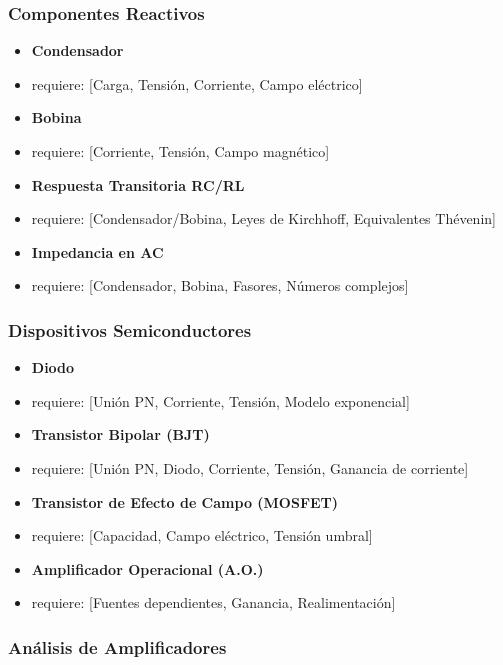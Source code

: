 \documentclass[11pt,a4paper]{article}
\begin{document}
\subsubsection*{Componentes Reactivos}


\begin{itemize}[leftmargin=*,topsep=2pt,itemsep=1pt]
  \item \textbf{Condensador}
  \item requiere: [Carga, Tensión, Corriente, Campo eléctrico]
  \item \textbf{Bobina}
  \item requiere: [Corriente, Tensión, Campo magnético]
  \item \textbf{Respuesta Transitoria RC/RL}
  \item requiere: [Condensador/Bobina, Leyes de Kirchhoff, Equivalentes Thévenin]
  \item \textbf{Impedancia en AC}
  \item requiere: [Condensador, Bobina, Fasores, Números complejos]
\end{itemize}


\subsubsection*{Dispositivos Semiconductores}


\begin{itemize}[leftmargin=*,topsep=2pt,itemsep=1pt]
  \item \textbf{Diodo}
  \item requiere: [Unión PN, Corriente, Tensión, Modelo exponencial]
  \item \textbf{Transistor Bipolar (BJT)}
  \item requiere: [Unión PN, Diodo, Corriente, Tensión, Ganancia de corriente]
  \item \textbf{Transistor de Efecto de Campo (MOSFET)}
  \item requiere: [Capacidad, Campo eléctrico, Tensión umbral]
  \item \textbf{Amplificador Operacional (A.O.)}
  \item requiere: [Fuentes dependientes, Ganancia, Realimentación]
\end{itemize}


\subsubsection*{Análisis de Amplificadores}
\end{document}
